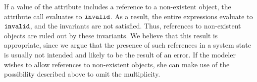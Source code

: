 If a value of the attribute  includes a reference to a non-existent
object, the attribute call evaluates to $\mathtt{invalid}$. As a result, the
entire expressions evaluate to $\mathtt{invalid}$, and the invariants are not
satisfied. Thus, references to non-existent objects are ruled out by these
invariants. We believe that this result is appropriate, since we argue that the
presence of such references in a system state is usually not intended and likely
to be the result of an error. If the modeler wishes to allow references to
non-existent objects, she can make use of the possibility described above to
omit the multiplicity.




